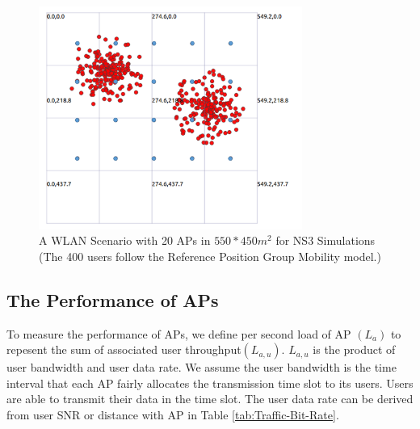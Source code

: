 \begin{figure}[tbp]
\begin{center}
\includegraphics[width=3.4in]{images/400n.png}
\end{center}
\caption{A WLAN Scenario with 20 APs in $550*450m^2$ for NS3 Simulations (The 400 users follow the Reference Position Group Mobility model.)}
\label{fig:scenario-400n}
\end{figure}

\subsection{The Performance of APs}
To measure the performance of APs, we define per second load of AP $(L_a)$ to repesent the sum of associated user throughput$(L_{a,u})$. $L_{a,u}$  is the product of user bandwidth and user data rate. We assume the user bandwidth is the time interval that each AP fairly allocates the transmission time slot to its users. Users are able to transmit their data in the time slot. The user data rate can be derived from user SNR or distance with AP in Table \ref{tab:Traffic-Bit-Rate}.

